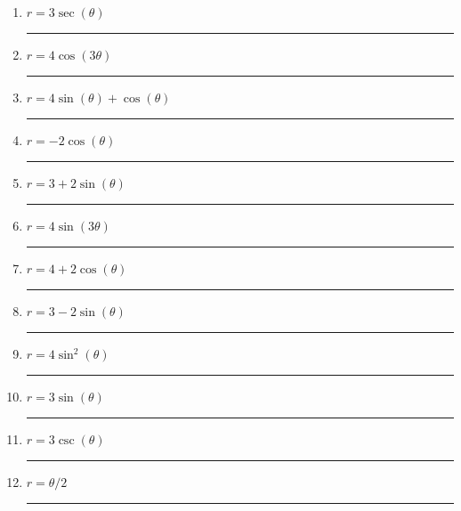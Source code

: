 \documentclass[11pt]{exam}
\begin{document}
\newcommand\aline[1]{\rule{0.5in}{0.2pt} }

\vspace{2ex}
\begin{multicols}{3}
	\begin{enumerate}
		\item $r = 3\sec(\theta)$ \aline{J}
		\item $r=4\cos(3\theta)$ \aline{G}
		\item $r=4\sin(\theta)+\cos(\theta)$ \aline{H}
		\item $r = -2 \cos(\theta)$ \aline{B}
		\item $r = 3+2\sin(\theta)$ \aline{C}
		\item $r=4\sin(3\theta)$ \aline{F}
		\item $r=4+2\cos(\theta)$ \aline{E}
		\item $r = 3-2\sin(\theta)$ \aline{D}
		\item $r=4\sin^2(\theta)$ \aline{I}
		\item $r = 3\sin(\theta)$ \aline{A}
		\item $r = 3\csc(\theta)$ \aline{L}
		\item $r = \theta/2$ \aline{K}
	\end{enumerate}
	\end{multicols}
\clearpage
\end{document}

